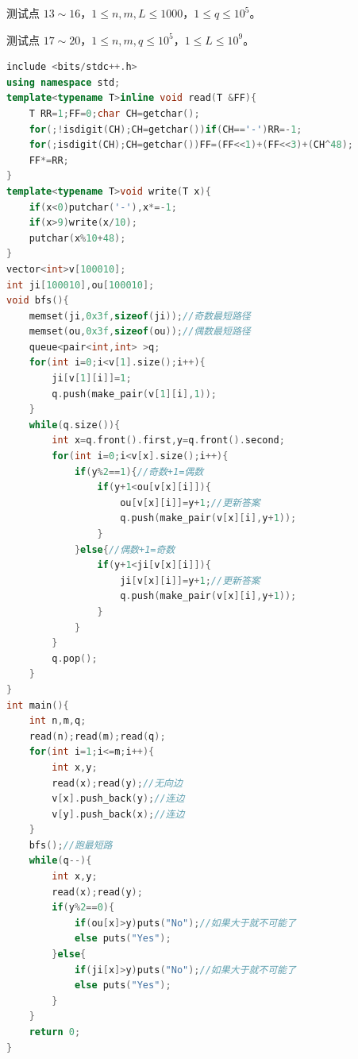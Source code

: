 \documentclass[12pt,twiside,a4paper]{ctexbook}
\numberwithin{chapter}{part}
\begin{document}
测试点 $13\sim16$，$1 \leq n, m, L \leq 1000$，$1 \leq q \leq 10^5$。

测试点 $17\sim20$，$1 \leq n, m, q \leq 10^5$，$1 \leq L \leq 10^9$。
\begin{lstlisting}[language=c++,breaklines=true]
include <bits/stdc++.h>
using namespace std;
template<typename T>inline void read(T &FF){
	T RR=1;FF=0;char CH=getchar();
	for(;!isdigit(CH);CH=getchar())if(CH=='-')RR=-1;
	for(;isdigit(CH);CH=getchar())FF=(FF<<1)+(FF<<3)+(CH^48);
	FF*=RR;
}
template<typename T>void write(T x){
	if(x<0)putchar('-'),x*=-1;
	if(x>9)write(x/10);
	putchar(x%10+48);
}
vector<int>v[100010];
int ji[100010],ou[100010];
void bfs(){
	memset(ji,0x3f,sizeof(ji));//奇数最短路径
	memset(ou,0x3f,sizeof(ou));//偶数最短路径
	queue<pair<int,int> >q;
	for(int i=0;i<v[1].size();i++){
		ji[v[1][i]]=1;
		q.push(make_pair(v[1][i],1));
	}
	while(q.size()){
		int x=q.front().first,y=q.front().second;
		for(int i=0;i<v[x].size();i++){
			if(y%2==1){//奇数+1=偶数
				if(y+1<ou[v[x][i]]){
					ou[v[x][i]]=y+1;//更新答案
					q.push(make_pair(v[x][i],y+1));
				}
			}else{//偶数+1=奇数
				if(y+1<ji[v[x][i]]){
					ji[v[x][i]]=y+1;//更新答案
					q.push(make_pair(v[x][i],y+1));
				}
			}
		}
		q.pop();
	}
}
int main(){
	int n,m,q;
	read(n);read(m);read(q);
	for(int i=1;i<=m;i++){
		int x,y;
		read(x);read(y);//无向边
		v[x].push_back(y);//连边
		v[y].push_back(x);//连边
	}
	bfs();//跑最短路
	while(q--){
		int x,y;
		read(x);read(y);
		if(y%2==0){
			if(ou[x]>y)puts("No");//如果大于就不可能了
			else puts("Yes");
		}else{
			if(ji[x]>y)puts("No");//如果大于就不可能了
			else puts("Yes");
		}
	}
	return 0;
}
\end{lstlisting}
\end{document}

